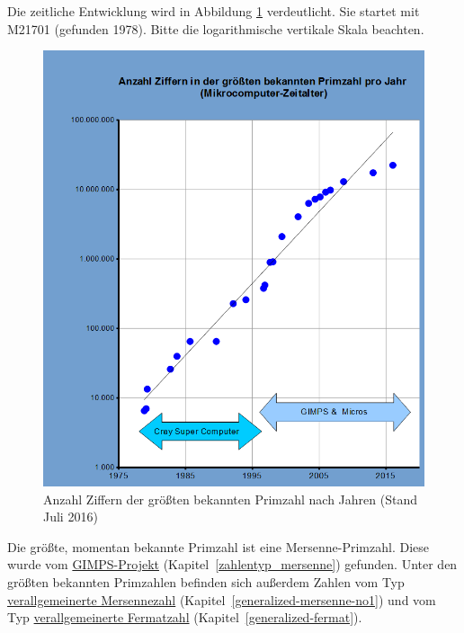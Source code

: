 \begin{refsegment}
\clearpage  %




Die zeitliche Entwicklung wird in Abbildung \ref{Figure_Caldwell_Largest-Known-Prime-From1975}
verdeutlicht. Sie startet mit M21701 (gefunden 1978). Bitte die logarithmische vertikale Skala beachten.
\begin{figure}[ht]
\begin{center}
\includegraphics[scale=0.7]{figures/Caldwell_From1975-2016-de.png}
\caption[Anzahl Ziffern der größten bekannten Primzahl nach Jahren seit 1975]
        {Anzahl Ziffern der größten bekannten Primzahl nach Jahren (Stand Juli 2016)\footnotemark}
\label{Figure_Caldwell_Largest-Known-Prime-From1975}
\end{center}
\end{figure}

Die größte, momentan bekannte Primzahl ist eine Mersenne-Primzahl.
Diese wurde vom \hyperlink{GIMPS-project}{GIMPS-Projekt}
(Kapitel~\ref{zahlentyp_mersenne}) gefunden.
Unter den größten bekannten Primzahlen befinden sich außerdem Zahlen
vom Typ \hyperlink{generalizedMersennenumbers}{verallgemeinerte Mersennezahl}
(Kapitel~\ref{generalized-mersenne-no1})
und
vom Typ \hyperlink{generalizedFermatprimes}{verallgemeinerte Fermatzahl}
(Kapitel~\ref{generalized-fermat}).


\end{refsegment}
